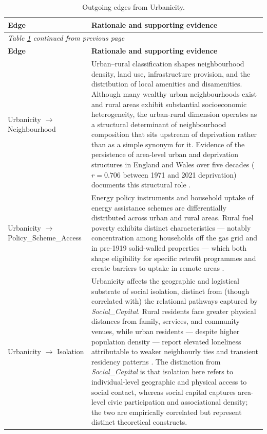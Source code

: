 \begin{longtable}{@{}p{3.8cm}p{11.2cm}@{}}
\caption{Outgoing edges from Urbanicity.}
\label{tab:edges-urbanicity}\\
\toprule
\textbf{Edge} & \textbf{Rationale and supporting evidence} \\
\midrule
\endfirsthead
\multicolumn{2}{l}{\textit{Table \ref{tab:edges-urbanicity} continued from previous page}}\\
\toprule
\textbf{Edge} & \textbf{Rationale and supporting evidence} \\
\midrule
\endhead
\bottomrule
\endfoot
Urbanicity $\to$ Neighbourhood & Urban–rural classification shapes neighbourhood density, land use, infrastructure provision, and the distribution of local amenities and disamenities. Although many wealthy urban neighbourhoods exist and rural areas exhibit substantial socioeconomic heterogeneity, the urban-rural dimension operates as a structural determinant of neighbourhood composition that sits upstream of deprivation rather than as a simple synonym for it. Evidence of the persistence of area-level urban and deprivation structures in England and Wales over five decades ($r = 0.706$ between 1971 and 2021 deprivation) documents this structural role \citep{lloyd_50-year_2024}. \\
\addlinespace
Urbanicity $\to$ Policy\_Scheme\_Access & Energy policy instruments and household uptake of energy assistance schemes are differentially distributed across urban and rural areas. Rural fuel poverty exhibits distinct characteristics — notably concentration among households off the gas grid and in pre-1919 solid-walled properties — which both shape eligibility for specific retrofit programmes and create barriers to uptake in remote areas \citep{roberts_fuel_2015}. \\
\addlinespace
Urbanicity $\to$ Isolation & Urbanicity affects the geographic and logistical substrate of social isolation, distinct from (though correlated with) the relational pathways captured by \textit{Social\_Capital}. Rural residents face greater physical distances from family, services, and community venues, while urban residents — despite higher population density — report elevated loneliness attributable to weaker neighbourly ties and transient residency patterns \citep{henningsmith_differences_2019, long_loneliness_2024, hussain_loneliness_2023}. The distinction from \textit{Social\_Capital} is that isolation here refers to individual-level geographic and physical access to social contact, whereas social capital captures area-level civic participation and associational density; the two are empirically correlated but represent distinct theoretical constructs. \\

\end{longtable}
